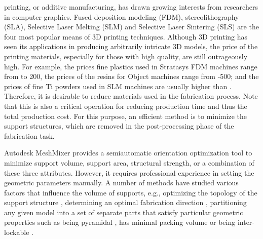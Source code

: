 


 printing, or additive manufacturing, has drawn growing interests from researchers in computer graphics. Fused deposition modeling (FDM), stereolithography (SLA), Selective Laser Melting (SLM) and Selective Laser Sintering (SLS) are the four most popular means of 3D printing techniques. Although 3D printing has seen its applications in producing arbitrarily intricate 3D models, the price of the printing materials, especially for those with high quality, are still outrageously high. {\color{red} For example, the prices fine plastics used in Stratasys FDM machines range from  to 200, the prices of the resins for Object machines range from -500; and the prices of fine Ti powders used in SLM machines are usually higher than .} Therefore, it is desirable to reduce materials used in the fabrication process. Note that this is also a critical operation for reducing production time and thus the total production cost. For this purpose, an efficient method is to minimize the support structures, which are removed in the post-processing phase of the fabrication task.

Autodesk MeshMixer provides a semiautomatic orientation optimization tool to minimize support volume, support area, structural strength, or a combination of these three attributes. However, it requires professional experience in setting the geometric parameters manually. A number of methods have studied various factors that influence the volume of supports, e.g., optimizing the topology of the support structure \cite{DumasHL14,VanekGB14}, determining an optimal fabrication direction \cite{Zhang:2015,HildebrandBA13,padhye2011multi}, partitioning any given model into a set of separate parts that satisfy particular geometric properties such as being pyramidal \cite{Hu_siga14}, has minimal packing volume \cite{VanekGBMCSM14} or being inter-lockable \cite{SongFLF15}.



